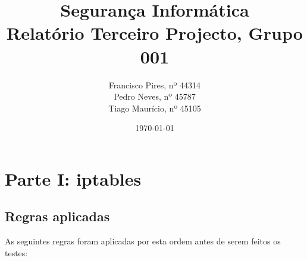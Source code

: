 \documentclass[12pt, a4paper, twoside]{report} %
\begin{document}
\title{%
	\textbf{Segurança Informática}\\ 
	\large Relatório Terceiro Projecto, Grupo 001
}

\author{%
Francisco Pires, nº 44314 \\
Pedro Neves, nº 45787 \\
Tiago Maurício, nº 45105 \\
}

\date{\today}
\maketitle

\chapter{Parte I: iptables}

\section{Regras aplicadas}

As seguintes regras foram aplicadas por esta ordem antes de serem feitos os testes:
\end{document}
